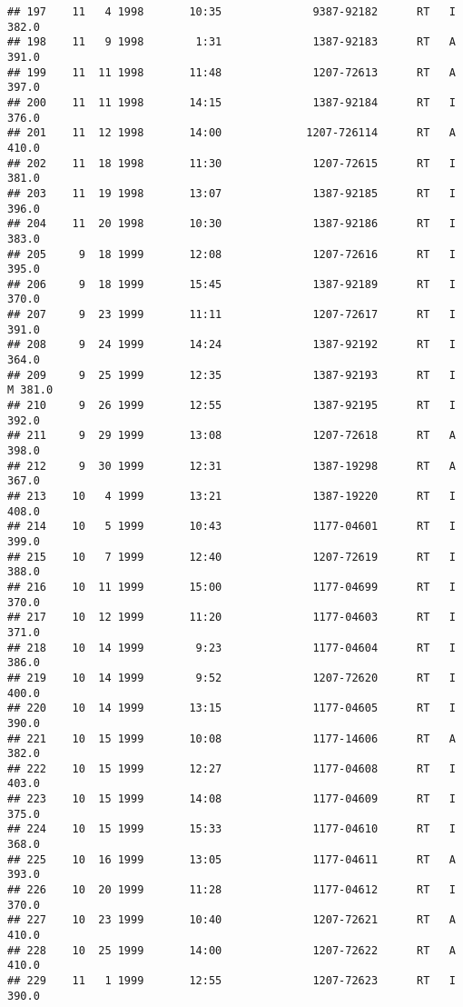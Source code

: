 \documentclass[
]{article}
\begin{document}
\begin{verbatim}
## 197    11   4 1998       10:35              9387-92182      RT   I     382.0
## 198    11   9 1998        1:31              1387-92183      RT   A     391.0
## 199    11  11 1998       11:48              1207-72613      RT   A     397.0
## 200    11  11 1998       14:15              1387-92184      RT   I     376.0
## 201    11  12 1998       14:00             1207-726114      RT   A     410.0
## 202    11  18 1998       11:30              1207-72615      RT   I     381.0
## 203    11  19 1998       13:07              1387-92185      RT   I     396.0
## 204    11  20 1998       10:30              1387-92186      RT   I     383.0
## 205     9  18 1999       12:08              1207-72616      RT   I     395.0
## 206     9  18 1999       15:45              1387-92189      RT   I     370.0
## 207     9  23 1999       11:11              1207-72617      RT   I     391.0
## 208     9  24 1999       14:24              1387-92192      RT   I     364.0
## 209     9  25 1999       12:35              1387-92193      RT   I   M 381.0
## 210     9  26 1999       12:55              1387-92195      RT   I     392.0
## 211     9  29 1999       13:08              1207-72618      RT   A     398.0
## 212     9  30 1999       12:31              1387-19298      RT   A     367.0
## 213    10   4 1999       13:21              1387-19220      RT   I     408.0
## 214    10   5 1999       10:43              1177-04601      RT   I     399.0
## 215    10   7 1999       12:40              1207-72619      RT   I     388.0
## 216    10  11 1999       15:00              1177-04699      RT   I     370.0
## 217    10  12 1999       11:20              1177-04603      RT   I     371.0
## 218    10  14 1999        9:23              1177-04604      RT   I     386.0
## 219    10  14 1999        9:52              1207-72620      RT   I     400.0
## 220    10  14 1999       13:15              1177-04605      RT   I     390.0
## 221    10  15 1999       10:08              1177-14606      RT   A     382.0
## 222    10  15 1999       12:27              1177-04608      RT   I     403.0
## 223    10  15 1999       14:08              1177-04609      RT   I     375.0
## 224    10  15 1999       15:33              1177-04610      RT   I     368.0
## 225    10  16 1999       13:05              1177-04611      RT   A     393.0
## 226    10  20 1999       11:28              1177-04612      RT   I     370.0
## 227    10  23 1999       10:40              1207-72621      RT   A     410.0
## 228    10  25 1999       14:00              1207-72622      RT   A     410.0
## 229    11   1 1999       12:55              1207-72623      RT   I     390.0

\end{verbatim}
\end{document}
